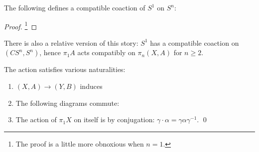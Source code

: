 \begin{subappendices}
\begin{lemma}
The following defines a compatible coaction of $S^1$ on $S^n$: 
\end{lemma}
\begin{proof}
\footnote{The proof is a little more obnoxious when $n = 1$.}
\end{proof}

\begin{remark}
There is also a relative version of this story: $S^1$ has a compatible coaction on $(CS^n, S^n)$, hence $\pi_1 A$ acts compatibly on $\pi_n(X, A)$ for $n \ge 2$.
\end{remark}

\begin{lemma}
The action satisfies various naturalities:
\begin{enumerate}
    \item $(X, A) \to (Y, B)$ induces
    \begin{center}
    \end{center}
    \item The following diagrams commute:
    \begin{center}
    \end{center}
    \item The action of $\pi_1 X$ on itself is by conjugation: $\gamma \cdot \alpha = \gamma \alpha \gamma^{-1}$. \qed
\end{enumerate}
\end{lemma}


\end{subappendices}
